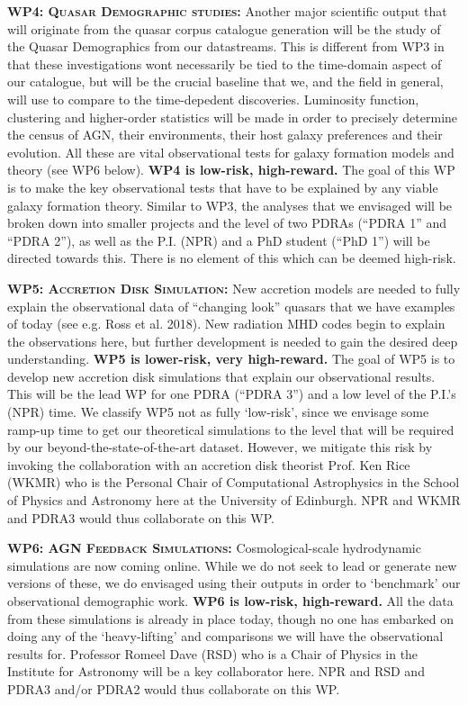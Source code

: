 \documentclass[oneside, a4paper, onecolumn, 11pt]{article}
\begin{document}
\smallskip
\smallskip
\noindent
\textbf{\textsc{WP4: Quasar Demographic studies:}} 
Another major scientific output that will originate from the quasar
corpus catalogue generation will be the study of the Quasar
Demographics from our datastreams. This is different from WP3 in that
these investigations wont necessarily be tied to the time-domain
aspect of our catalogue, but will be the crucial baseline that we, and
the field in general, will use to compare to the time-depedent
discoveries. Luminosity function, clustering and higher-order
statistics will be made in order to precisely determine the census of
AGN, their environments, their host galaxy preferences and their
evolution. All these are vital observational tests for galaxy
formation models and theory (see WP6 below).
{\bf WP4 is low-risk, high-reward.}
The goal of this WP is to make the key observational tests that have
to be explained by any viable galaxy formation theory.  Similar to
WP3, the analyses that we envisaged will be broken down into smaller
projects and the level of two PDRAs (``PDRA 1'' and ``PDRA 2''), as
well as the P.I. (NPR) and a PhD student (``PhD 1'') will be directed
towards this. There is no element of this which can be deemed
high-risk.


\smallskip
\smallskip
\noindent
\textbf{\textsc{WP5: Accretion Disk Simulation:}} 
New accretion models are needed to fully explain the observational
data of ``changing look'' quasars that we have examples of today (see
e.g. Ross et al. 2018). New radiation MHD codes begin to explain the
observations here, but further development is needed to gain the
desired deep understanding. 
{\bf WP5 is lower-risk, very high-reward.}
The goal of WP5 is to develop new accretion disk simulations that
explain our observational results.  This will be the lead WP for one
PDRA (``PDRA 3'') and a low level of the P.I.'s (NPR) time. We
classify WP5 not as fully `low-risk', since we envisage some ramp-up
time to get our theoretical simulations to the level that will be required by 
our beyond-the-state-of-the-art dataset. However, we mitigate this risk
by invoking the collaboration with an accretion disk theorist
Prof. Ken Rice (WKMR) who is the Personal Chair of Computational
Astrophysics in the School of Physics and Astronomy here at the
University of Edinburgh. NPR and WKMR and PDRA3 would thus collaborate 
on this WP. 


\smallskip
\smallskip
\noindent
\textbf{\textsc{WP6: AGN Feedback Simulations:}} 
Cosmological-scale hydrodynamic simulations are now coming online. 
While we do not seek to lead or generate new versions of these, we do 
envisaged using their outputs in order to `benchmark' our observational 
demographic work. 
{\bf WP6 is low-risk, high-reward.}
All the data from these simulations is already in place today, though no one 
has embarked on doing any of the `heavy-lifting' and comparisons we will 
have the observational results for. Professor Romeel Dave (RSD) who is a Chair of Physics 
in the Institute for Astronomy will be a key collaborator here. 
NPR and RSD and PDRA3 and/or PDRA2 would thus collaborate on this WP. 
\end{document}
